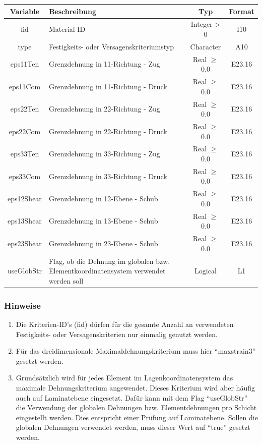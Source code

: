 \documentclass[11pt,titlepage,listof=totoc,bibliography=totoc,twoside]{scrreprt}
\begin{document}
{{\begin{tabularx}{\textwidth}{cXcc}
\toprule
Variable	& Beschreibung														& Typ			& Format\\
\midrule
fid		& Material-ID														& Integer > 0		& I10	\\
type		& Festigkeits- oder Versagenskriteriumstyp										& Character		& A10	\\
eps11Ten	& Grenzdehnung in 11-Richtung - Zug											& Real $\ge$ 0.0	& E23.16\\
eps11Com	& Grenzdehnung in 11-Richtung - Druck											& Real $\ge$ 0.0	& E23.16\\
eps22Ten	& Grenzdehnung in 22-Richtung - Zug											& Real $\ge$ 0.0	& E23.16\\
eps22Com	& Grenzdehnung in 22-Richtung - Druck											& Real $\ge$ 0.0	& E23.16\\
eps33Ten	& Grenzdehnung in 33-Richtung - Zug 											& Real $\ge$ 0.0	& E23.16\\
eps33Com	& Grenzdehnung in 33-Richtung - Druck											& Real $\ge$ 0.0	& E23.16\\
eps12Shear	& Grenzdehnung in 12-Ebene - Schub											& Real $\ge$ 0.0	& E23.16\\
eps13Shear	& Grenzdehnung in 13-Ebene - Schub 											& Real $\ge$ 0.0	& E23.16\\
eps23Shear	& Grenzdehnung in 23-Ebene - Schub											& Real $\ge$ 0.0	& E23.16\\
useGlobStr	& Flag, ob die Dehnung im globalen bzw. Elementkoordinatensystem verwendet werden soll					& Logical		& L1\\
\bottomrule
\end{tabularx}

\subsubsection{Hinweise}

\begin{enumerate}
\item Die Kriterien-ID's (fid) dürfen für die gesamte Anzahl an verwendeten Festigkeits- oder Versagenskriterien nur einmalig genutzt werden.
\item Für das dreidimensionale Maximaldehnungskriterium muss hier ``maxstrain3'' gesetzt werden.
\item Grundsätzlich wird für jedes Element im Lagenkoordinatensystem das maximale Dehnungskriterium angewendet. Dieses Kriterium wird aber häufig auch auf Laminatebene eingesetzt. Dafür kann mit dem Flag ``useGlobStr'' die Verwendung der globalen Dehnungen bzw. Elementdehnungen pro Schicht eingestellt werden. Dies entspricht einer Prüfung auf Laminatebene. Sollen die globalen Dehnungen verwendet werden, muss dieser Wert auf ``true'' gesetzt werden.
\end{enumerate}

}}
\end{document}
